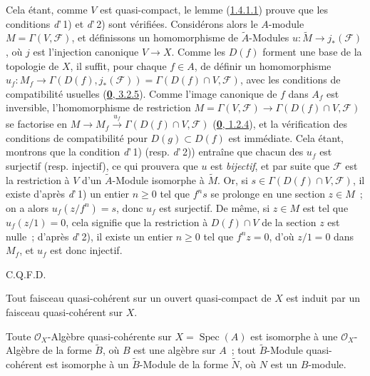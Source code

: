 Cela étant, comme $V$ est quasi-compact, le lemme
(\hyperref[I.1.4.1.1-fr]{1.4.1.1}) prouve que les conditions
\textit{d}'\,1) et \textit{d}'\,2) sont vérifiées. Considérons alors le
$A$-module $M=\Gamma(V,\mathscr{F})$, et définissons un homomorphisme de
$\widetilde{A}$-Modules $u:\widetilde{M}\to j_*(\mathscr{F})$, où $j$ est
l'injection canonique $V\to X$. Comme les $D(f)$ forment une base de la
topologie de $X$, il suffit, pour chaque $f\in A$, de définir un
homomorphisme
$u_f:M_f\to\Gamma(D(f),j_*(\mathscr{F}))=\Gamma(D(f)\cap V,\mathscr{F})$,
avec les conditions de compatibilité usuelles
(\hyperref[0.3.2.5-fr]{\textbf{0}, 3.2.5}). Comme l'image canonique de $f$ dans
$A_f$ est inversible, l'homomorphisme de restriction
$M=\Gamma(V,\mathscr{F})\to\Gamma(D(f)\cap V,\mathscr{F})$ se factorise en
$M\longrightarrow M_f\xrightarrow{u_f}\Gamma(D(f)\cap V,\mathscr{F})$
(\hyperref[0.1.2.4-fr]{\textbf{0}, 1.2.4}), et la vérification des conditions de
compatibilité pour $D(g)\subset D(f)$ est immédiate. Cela étant, montrons
que la condition \textit{d}'\,1) (resp. \textit{d}'\,2)) entraîne que chacun
des $u_f$ est surjectif (resp. injectif), ce qui prouvera que $u$ est
\emph{bijectif}, et par suite que $\mathscr{F}$ est la restriction à $V$
d'un $\widetilde{A}$-Module isomorphe à $\widetilde{M}$. Or, si
$s\in\Gamma(D(f)\cap V,\mathscr{F})$, il existe d'après \textit{d}'\,1) un
entier $n\geq0$ tel que $f^n s$ se prolonge en une section $z\in M$~; on a
alors $u_f(z/f^n)=s$, donc $u_f$ est surjectif. De même, si $z\in M$ est tel
que $u_f(z/1)=0$, cela signifie que la restriction à $D(f)\cap V$ de la
section $z$ est nulle~; d'après \textit{d}'\,2), il existe un entier
$n\geq0$ tel que $f^n z=0$, d'où $z/1=0$ dans $M_f$, et $u_f$ est donc
injectif.

\par\hfill C.Q.F.D.\par

\begin{corollary}[1.4.2]
\label{I.1.4.2-fr}
Tout faisceau quasi-cohérent sur un ouvert quasi-compact de $X$ est induit
par un faisceau quasi-cohérent sur $X$.
\end{corollary}

\begin{corollary}[1.4.3]
\label{I.1.4.3-fr}
Toute $\mathscr{O}_X$-Algèbre quasi-cohérente sur
$X=\operatorname{Spec}(A)$ est isomorphe à une $\mathscr{O}_X$-Algèbre de
la forme $\widetilde{B}$, où $B$ est une algèbre sur $A$~; tout
$\widetilde{B}$-Module quasi-cohérent est isomorphe à un
$\widetilde{B}$-Module de la forme $\widetilde{N}$, où $N$ est un
$B$-module.
\end{corollary}

